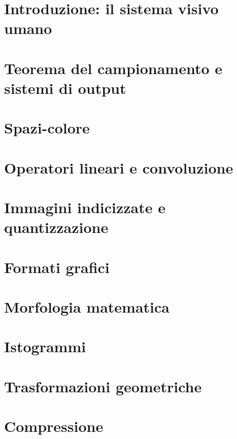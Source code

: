 \documentclass{article}
\begin{document}


\tableofcontents
\restoregeometry

\section{Introduzione: il sistema visivo umano}


\section{Teorema del campionamento e sistemi di output}


\section{Spazi-colore}


\section{Operatori lineari e convoluzione}


\section{Immagini indicizzate e quantizzazione}


\section{Formati grafici}


\section{Morfologia matematica}


\section{Istogrammi}


\section{Trasformazioni geometriche}


\section{Compressione}

\end{document}
